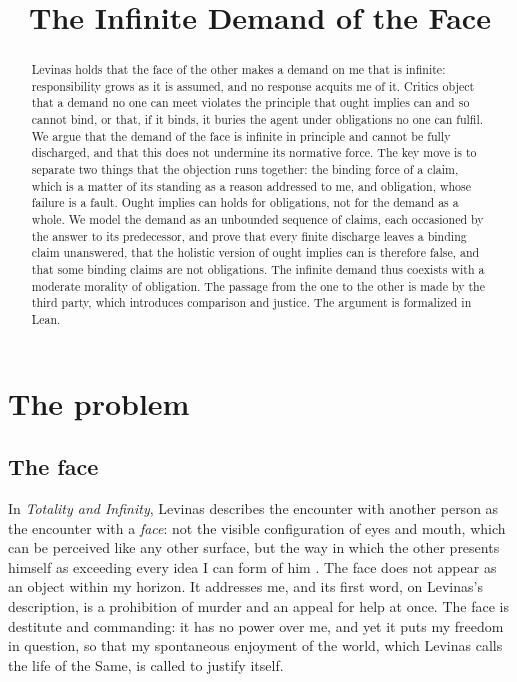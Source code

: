 \documentclass{situationist-preprint}
\title{The Infinite Demand of the Face}
\begin{document}
\maketitle

\begin{abstract}
Levinas holds that the face of the other makes a demand on me that is infinite: responsibility grows as it is assumed, and no response acquits me of it. Critics object that a demand no one can meet violates the principle that ought implies can and so cannot bind, or that, if it binds, it buries the agent under obligations no one can fulfil. We argue that the demand of the face is infinite in principle and cannot be fully discharged, and that this does not undermine its normative force. The key move is to separate two things that the objection runs together: the binding force of a claim, which is a matter of its standing as a reason addressed to me, and obligation, whose failure is a fault. Ought implies can holds for obligations, not for the demand as a whole. We model the demand as an unbounded sequence of claims, each occasioned by the answer to its predecessor, and prove that every finite discharge leaves a binding claim unanswered, that the holistic version of ought implies can is therefore false, and that some binding claims are not obligations. The infinite demand thus coexists with a moderate morality of obligation. The passage from the one to the other is made by the third party, which introduces comparison and justice. The argument is formalized in Lean.
\end{abstract}

\section{The problem}

\subsection{The face}

In \emph{Totality and Infinity}, Levinas describes the encounter with another person as the encounter with a \emph{face}: not the visible configuration of eyes and mouth, which can be perceived like any other surface, but the way in which the other presents himself as exceeding every idea I can form of him \citep[I.C, III.B]{Levinas1961}. The face does not appear as an object within my horizon. It addresses me, and its first word, on Levinas's description, is a prohibition of murder and an appeal for help at once. The face is destitute and commanding: it has no power over me, and yet it puts my freedom in question, so that my spontaneous enjoyment of the world, which Levinas calls the life of the Same, is called to justify itself.
\end{document}
